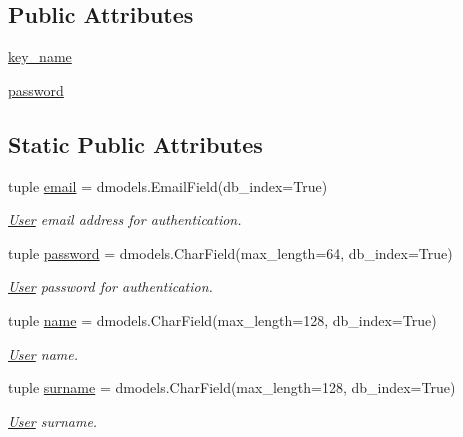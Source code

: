 \subsection*{Public Attributes}
\begin{DoxyCompactItemize}
\item 
\hyperlink{classcore_1_1models_1_1User_a850844de5beed6acc7ce8548e56b40f6}{key\-\_\-name}
\item 
\hyperlink{classcore_1_1models_1_1User_a7d320bc1c53745b1f8ca4f91e3cc19ea}{password}
\end{DoxyCompactItemize}
\subsection*{Static Public Attributes}
\begin{DoxyCompactItemize}
\item 
tuple \hyperlink{classcore_1_1models_1_1User_a214f7506978bd5f697a493f1b4f83553}{email} = dmodels.\-Email\-Field(db\-\_\-index=True)
\begin{DoxyCompactList}\small\item\em \hyperlink{classcore_1_1models_1_1User}{User} email address for authentication. \end{DoxyCompactList}\item 
tuple \hyperlink{classcore_1_1models_1_1User_a7d320bc1c53745b1f8ca4f91e3cc19ea}{password} = dmodels.\-Char\-Field(max\-\_\-length=64, db\-\_\-index=True)
\begin{DoxyCompactList}\small\item\em \hyperlink{classcore_1_1models_1_1User}{User} password for authentication. \end{DoxyCompactList}\item 
tuple \hyperlink{classcore_1_1models_1_1User_a6e3378459abae4fc27fcd46d1cd24990}{name} = dmodels.\-Char\-Field(max\-\_\-length=128, db\-\_\-index=True)
\begin{DoxyCompactList}\small\item\em \hyperlink{classcore_1_1models_1_1User}{User} name. \end{DoxyCompactList}\item 
tuple \hyperlink{classcore_1_1models_1_1User_a3804f136ea7cba3a9611f8432450ed4c}{surname} = dmodels.\-Char\-Field(max\-\_\-length=128, db\-\_\-index=True)
\begin{DoxyCompactList}\small\item\em \hyperlink{classcore_1_1models_1_1User}{User} surname. \end{DoxyCompactList}\item 

\end{DoxyCompactItemize}
